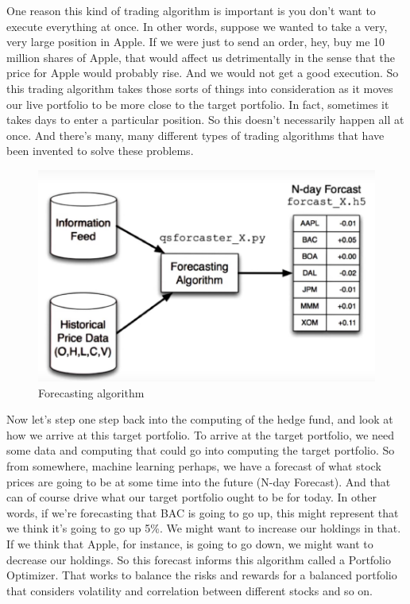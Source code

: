 \documentclass[12pt]{article}
\begin{document}
One reason this kind of trading algorithm is important is you don't want to execute everything at once. In other words, suppose we wanted to take a very, very large position in Apple. If we were just to send an order, hey, buy me 10 million shares of Apple, that would affect us detrimentally in the sense that the price for Apple would probably rise. And we would not get a good execution. So this trading algorithm takes those sorts of things into consideration as it moves our live portfolio to be more close to the target portfolio. In fact, sometimes it takes days to enter a particular position. So this doesn't necessarily happen all at once. And there's many, many different types of trading algorithms that have been invented to solve these problems. \\[8pt]
\begin{figure}[!ht]
\centering
\includegraphics[scale=0.35]{fig/fig25}
\caption{Forecasting algorithm}
\end{figure}
\noindent
Now let's step one step back into the computing of the hedge fund, and look at how we arrive at this target portfolio. To arrive at the target portfolio, we need some data and computing that could go into computing the target portfolio. So from somewhere, machine learning perhaps, we have a forecast of what stock prices are going to be at some time into the future (N-day Forecast). And that can of course drive what our target portfolio ought to be for today. In other words, if we're forecasting that BAC is going to go up, this might represent that we think it's going to go up 5\%. We might want to increase our holdings in that. If we think that Apple, for instance, is going to go down, we might want to decrease our holdings. So this forecast informs this algorithm called a Portfolio Optimizer. That works to balance the risks and rewards for a balanced portfolio that considers volatility and correlation between different stocks and so on. 
\end{document}
